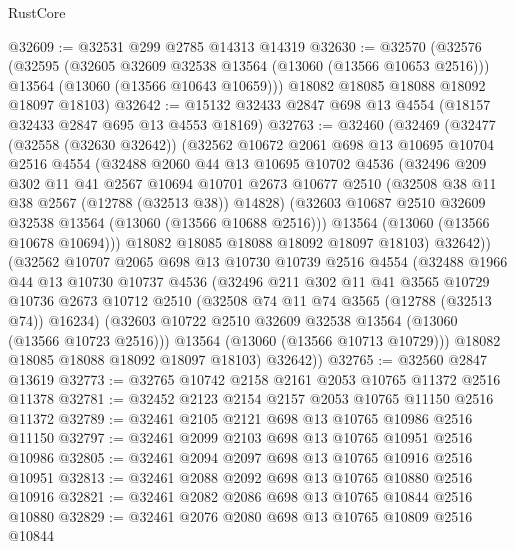\begin{lexlean}{RustCore}
\begin{coremodule}
@32609 := @32531 @299 @2785 @14313 @14319
@32630 := @32570
    (@32576
      (@32595
        (@32605 @32609 @32538 @13564 (@13060 (@13566 @10653 @2516)))
        @13564
        (@13060 (@13566 @10643 @10659)))
      @18082
      @18085
      @18088
      @18092
      @18097
      @18103)
@32642 := @15132 @32433 @2847 @698 @13 @4554 (@18157 @32433 @2847 @695 @13 @4553 @18169)
@32763 := @32460
    (@32469
      (@32477
        (@32558 (@32630 @32642))
        (@32562
          @10672
          @2061
          @698
          @13
          @10695
          @10704
          @2516
          @4554
          (@32488
            @2060
            @44
            @13
            @10695
            @10702
            @4536
            (@32496
              @209
              @302
              @11
              @41
              @2567
              @10694
              @10701
              @2673
              @10677
              @2510
              (@32508 @38 @11 @38 @2567 (@12788 (@32513 @38)) @14828)
              (@32603 @10687 @2510 @32609 @32538 @13564 (@13060 (@13566 @10688 @2516)))
              @13564
              (@13060 (@13566 @10678 @10694)))
            @18082
            @18085
            @18088
            @18092
            @18097
            @18103)
          @32642))
      (@32562
        @10707
        @2065
        @698
        @13
        @10730
        @10739
        @2516
        @4554
        (@32488
          @1966
          @44
          @13
          @10730
          @10737
          @4536
          (@32496
            @211
            @302
            @11
            @41
            @3565
            @10729
            @10736
            @2673
            @10712
            @2510
            (@32508 @74 @11 @74 @3565 (@12788 (@32513 @74)) @16234)
            (@32603 @10722 @2510 @32609 @32538 @13564 (@13060 (@13566 @10723 @2516)))
            @13564
            (@13060 (@13566 @10713 @10729)))
          @18082
          @18085
          @18088
          @18092
          @18097
          @18103)
        @32642))
@32765 := @32560 @2847 @13619
@32773 := @32765 @10742 @2158 @2161 @2053 @10765 @11372 @2516 @11378
@32781 := @32452 @2123 @2154 @2157 @2053 @10765 @11150 @2516 @11372
@32789 := @32461 @2105 @2121 @698 @13 @10765 @10986 @2516 @11150
@32797 := @32461 @2099 @2103 @698 @13 @10765 @10951 @2516 @10986
@32805 := @32461 @2094 @2097 @698 @13 @10765 @10916 @2516 @10951
@32813 := @32461 @2088 @2092 @698 @13 @10765 @10880 @2516 @10916
@32821 := @32461 @2082 @2086 @698 @13 @10765 @10844 @2516 @10880
@32829 := @32461 @2076 @2080 @698 @13 @10765 @10809 @2516 @10844

\end{coremodule}
\end{lexlean}
